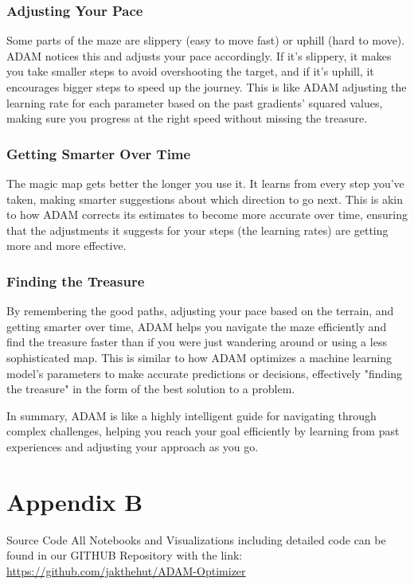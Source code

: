\documentclass[journal]{IEEEtran}
\begin{document}
\subsubsection*{Adjusting Your Pace}
Some parts of the maze are slippery (easy to move fast) or uphill (hard to move). ADAM notices this and adjusts your pace accordingly. If it's slippery, it makes you take smaller steps to avoid overshooting the target, and if it's uphill, it encourages bigger steps to speed up the journey. This is like ADAM adjusting the learning rate for each parameter based on the past gradients' squared values, making sure you progress at the right speed without missing the treasure.

\subsubsection*{Getting Smarter Over Time}
The magic map gets better the longer you use it. It learns from every step you've taken, making smarter suggestions about which direction to go next. This is akin to how ADAM corrects its estimates to become more accurate over time, ensuring that the adjustments it suggests for your steps (the learning rates) are getting more and more effective.  
   
\subsubsection*{Finding the Treasure}
By remembering the good paths, adjusting your pace based on the terrain, and getting smarter over time, ADAM helps you navigate the maze efficiently and find the treasure faster than if you were just wandering around or using a less sophisticated map. This is similar to how ADAM optimizes a machine learning model's parameters to make accurate predictions or decisions, effectively "finding the treasure" in the form of the best solution to a problem. 
  
In summary, ADAM is like a highly intelligent guide for navigating through complex challenges, helping you reach your goal efficiently by learning from past experiences and adjusting your approach as you go.

\section{Appendix B}
\centering Source Code
All Notebooks and Visualizations including detailed code can be found in our GITHUB Repository with the link: \href{https://github.com/jakthehut/ADAM-Optimizer}{https://github.com/jakthehut/ADAM-Optimizer}
\end{document}

